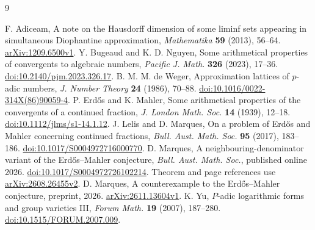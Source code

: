 \documentclass[11pt]{article}
\begin{document}
\begin{thebibliography}{9}
\small\raggedright
\setlength{\itemsep}{1pt}
 F. Adiceam, A note on the Hausdorff dimension of some
liminf sets appearing in simultaneous Diophantine approximation,
\emph{Mathematika} \textbf{59} (2013), 56--64.
\href{https://arxiv.org/abs/1209.6500v1}{arXiv:1209.6500v1}.
 Y. Bugeaud and K. D. Nguyen, Some arithmetical properties of
convergents to algebraic numbers, \emph{Pacific J. Math.} \textbf{326}
(2023), 17--36. \href{https://doi.org/10.2140/pjm.2023.326.17}{doi:10.2140/pjm.2023.326.17}.
 B. M. M. de Weger, Approximation lattices of $p$-adic
numbers, \emph{J. Number Theory} \textbf{24} (1986), 70--88.
\href{https://doi.org/10.1016/0022-314X(86)90059-4}{doi:10.1016/0022-314X(86)90059-4}.
 P. Erd\H{o}s and K. Mahler, Some arithmetical properties of
the convergents of a continued fraction, \emph{J. London Math. Soc.}
\textbf{14} (1939), 12--18.
\href{https://doi.org/10.1112/jlms/s1-14.1.12}{doi:10.1112/jlms/s1-14.1.12}.
 J. Lelis and D. Marques, On a problem of Erd\H{o}s and Mahler
concerning continued fractions, \emph{Bull. Aust. Math. Soc.}
\textbf{95} (2017), 183--186.
\href{https://doi.org/10.1017/S0004972716000770}{doi:10.1017/S0004972716000770}.
 D. Marques, A neighbouring-denominator variant of the
Erd\H{o}s--Mahler conjecture, \emph{Bull. Aust. Math. Soc.}, published online
2026. \href{https://doi.org/10.1017/S0004972726102214}{doi:10.1017/S0004972726102214}.
Theorem and page references use
\href{https://arxiv.org/abs/2608.26455v2}{arXiv:2608.26455v2}.
 D. Marques, A counterexample to the Erd\H{o}s--Mahler
conjecture, preprint, 2026. \href{https://arxiv.org/abs/2611.13604v1}{arXiv:2611.13604v1}.
 K. Yu, $P$-adic logarithmic forms and group varieties III,
\emph{Forum Math.} \textbf{19} (2007), 187--280.
\href{https://doi.org/10.1515/FORUM.2007.009}{doi:10.1515/FORUM.2007.009}.
\end{thebibliography}
\end{document}

